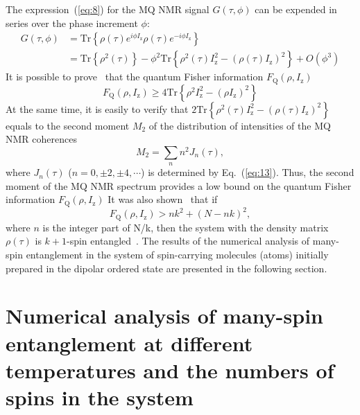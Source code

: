 \documentclass[review]{elsarticle}
\begin{document}
The expression~(\ref{eq:8}) for the MQ NMR signal $G(\tau,\phi)$ can be expended in series over the phase increment $\phi$:
%
\begin{equation}
    \begin{split}
        \label{eq:17}
        G(\tau,\phi)  
        & = \mathrm{Tr} \left\{ 
            \rho(\tau) e^{i \phi I_\mathrm{z} }
            \rho(\tau) e^{-i\phi I_\mathrm{z}}
        \right\}  \\
        & = \mathrm{Tr} \left\{ \rho^2(\tau) \right\} 
        - \phi^2 \mathrm{Tr} \left\{ 
            \rho^2(\tau) I^2_\mathrm{z} 
            - (\rho(\tau) I_\mathrm{z})^2
        \right\} 
        + O(\phi^3)
    \end{split}
\end{equation}
%
It is possible to prove~\cite{Girolami_2017} that the quantum Fisher information $F_\mathrm{Q}(\rho,I_\mathrm{z})$~\cite{Helstrom_1969}
%
\begin{equation}
    \label{eq:18}
    F_\mathrm{Q}(\rho,I_\mathrm{z}) \geq 4 \mathrm{Tr} \left\{ \rho^2 I^2_\mathrm{z} - (\rho I_\mathrm{z})^2 \right\}
\end{equation}
%
At the same time, it is easily to verify that $2 \mathrm{Tr} \left\{ \rho^2(\tau) I_\mathrm{z}^2 - \left( \rho(\tau) I_\mathrm{z} \right)^2 \right\}$ equals to the second moment $M_2$ of the distribution of intensities of the MQ NMR coherences~\cite{Khitrin_1997}
%
\begin{equation}
    \label{eq:19}
    M_2 = \sum_{n} n^2 J_n (\tau) ,
\end{equation}
%
where $J_n(\tau)$ ($n=0,\pm 2, \pm 4, \cdots$) is determined by Eq.~(\ref{eq:13}).
Thus, the second moment of the MQ NMR spectrum provides a low bound on the quantum Fisher information $F_\mathrm{Q}(\rho,I_\mathrm{z})$
It was also shown~\cite{T_th_2014,Pezz__2018} that if
%
\begin{equation}
    \label{eq:20}
    F_\mathrm{Q} (\rho,I_\mathrm{z}) > n k^2 + (N - n k)^2,
\end{equation}
%
where $n$ is the integer part of {N/k}, then the system with the density matrix $\rho(\tau)$ is $k+1$-spin entangled~\cite{Pezz__2009,Hyllus_2012,T_th_2012}.
The results of the numerical analysis of many-spin entanglement in the system of spin-carrying molecules (atoms) initially prepared in the dipolar ordered state are presented in the following section.



\section{Numerical analysis of many-spin entanglement at different temperatures and the numbers of spins in the system}
\label{sec:5}
\end{document}
